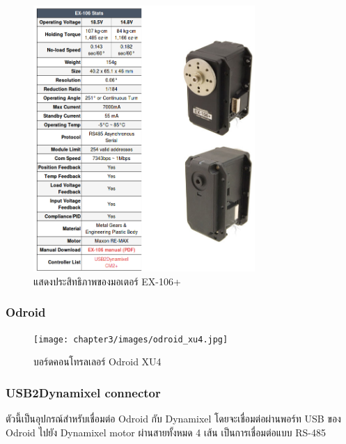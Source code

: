 \begin{figure}[ht]
    \centering
    \includegraphics[width=0.75\textwidth]{chapter3/images/dxl_ex106.png}
    \caption{แสดงประสิทธิภาพของมอเตอร์ EX-106+}
    \label{fig:dxl_ex106}
\end{figure}

\clearpage
\subsubsection*{Odroid}

\begin{figure}[ht]
    \centering
    \texttt{[image: chapter3/images/odroid\_xu4.jpg]}
    \caption{บอร์ดคอนโทรลเลอร์ Odroid XU4}
    \label{fig:dxl_ex106}
\end{figure}

\subsubsection*{USB2Dynamixel connector}
ตัวนี้เป็นอุปกรณ์สำหรับเชื่อมต่อ Odroid กับ Dynamixel โดยจะเชื่อมต่อผ่านพอร์ท USB ของ Odroid ไปยัง Dynamixel motor
ผ่านสายทั้งหมด 4 เส้น เป็นการเชื่อมต่อแบบ RS-485 
